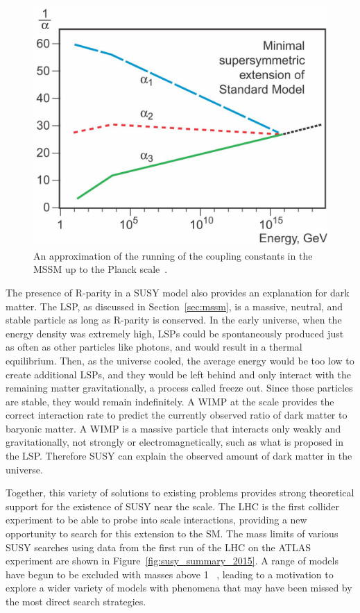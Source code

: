 \begin{figure}
\centering
\includegraphics[width=\fullfig]{figures/unification_susy.jpg}
\caption{An approximation of the running of the coupling constants in the \acs*{MSSM} up to the Planck scale~\cite{unification_plot}.}
\label{fig:unification_susy}
\end{figure}

The presence of R-parity in a \ac{SUSY} model also provides an explanation for dark matter.
The \ac{LSP}, as discussed in Section~\ref{sec:mssm}, is a massive, neutral, and stable particle as long as R-parity is conserved.
In the early universe, when the energy density was extremely high, \acp{LSP} could be spontaneously produced just as often as other particles like photons, and would result in a thermal equilibrium.
Then, as the universe cooled, the average energy would be too low to create additional \acp{LSP}, and they would be left behind and only interact with the remaining matter gravitationally, a process called freeze out.
Since those particles are stable, they would remain indefinitely. 
A \ac{WIMP} at the \TeV scale provides the correct interaction rate to predict the currently observed ratio of dark matter to baryonic matter.
A \ac{WIMP} is a massive particle that interacts only weakly and gravitationally, not strongly or electromagnetically, such as what is proposed in the \ac{LSP}. 
Therefore \ac{SUSY} can explain the observed amount of dark matter in the universe.

Together, this variety of solutions to existing problems provides strong theoretical support for the existence of \ac{SUSY} near the \TeV scale.
The \ac{LHC} is the first collider experiment to be able to probe into \TeV scale interactions, providing a new opportunity to search for this extension to the \ac{SM}.
The mass limits of various \ac{SUSY} searches using data from the first run of the \ac{LHC} on the ATLAS experiment are shown in Figure~\ref{fig:susy_summary_2015}.
A range of models have begun to be excluded with masses above 1 \TeV~\cite{pdg}, leading to a motivation to explore a wider variety of models with phenomena that may have been missed by the most direct search strategies.

